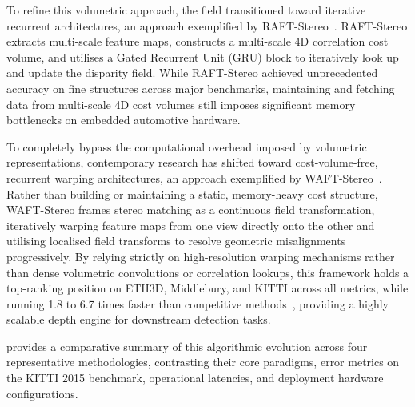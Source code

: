 To refine this volumetric approach, the field transitioned toward iterative
recurrent architectures, an approach exemplified by RAFT-Stereo~\cite{lipson2021}.
RAFT-Stereo extracts multi-scale feature maps, constructs a multi-scale 4D
correlation cost volume, and utilises a Gated Recurrent Unit (GRU) block to
iteratively look up and update the disparity field. While RAFT-Stereo achieved
unprecedented accuracy on fine structures across major benchmarks, maintaining
and fetching data from multi-scale 4D cost volumes still imposes significant
memory bottlenecks on embedded automotive hardware.

To completely bypass the computational overhead imposed by volumetric
representations, contemporary research has shifted toward cost-volume-free,
recurrent warping architectures, an approach exemplified by
WAFT-Stereo~\cite{wang2026}. Rather than building or maintaining a static,
memory-heavy cost structure, WAFT-Stereo frames stereo matching as a continuous
field transformation, iteratively warping feature maps from one view directly
onto the other and utilising localised field transforms to resolve geometric
misalignments progressively. By relying strictly on high-resolution warping
mechanisms rather than dense volumetric convolutions or correlation lookups, this
framework holds a top-ranking position on ETH3D, Middlebury, and KITTI across all
metrics, while running 1.8 to 6.7 times faster than competitive
methods~\cite{wang2026}, providing a highly scalable depth engine for downstream
detection tasks.

 provides a comparative summary of this algorithmic evolution
across four representative methodologies, contrasting their core paradigms, error
metrics on the KITTI 2015 benchmark, operational latencies, and deployment
hardware configurations.

\begin{table}[ht]
\centering
\caption{Representative stereo depth estimation methods on the KITTI 2015 benchmark.}
\label{tab:stereo}
\renewcommand{\arraystretch}{1.6}
\small
{}
\end{table}





